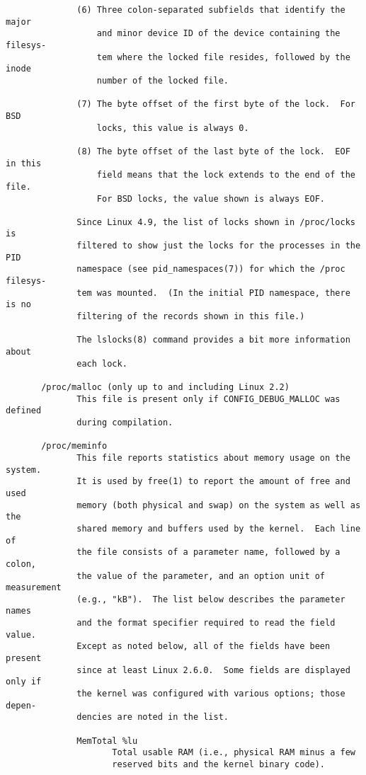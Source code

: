 \documentclass[]{article}
\begin{document}
\begin{verbatim}
              (6) Three colon-separated subfields that identify the major
                  and minor device ID of the device containing the filesys‐
                  tem where the locked file resides, followed by the inode
                  number of the locked file.

              (7) The byte offset of the first byte of the lock.  For BSD
                  locks, this value is always 0.

              (8) The byte offset of the last byte of the lock.  EOF in this
                  field means that the lock extends to the end of the file.
                  For BSD locks, the value shown is always EOF.

              Since Linux 4.9, the list of locks shown in /proc/locks is
              filtered to show just the locks for the processes in the PID
              namespace (see pid_namespaces(7)) for which the /proc filesys‐
              tem was mounted.  (In the initial PID namespace, there is no
              filtering of the records shown in this file.)

              The lslocks(8) command provides a bit more information about
              each lock.

       /proc/malloc (only up to and including Linux 2.2)
              This file is present only if CONFIG_DEBUG_MALLOC was defined
              during compilation.

       /proc/meminfo
              This file reports statistics about memory usage on the system.
              It is used by free(1) to report the amount of free and used
              memory (both physical and swap) on the system as well as the
              shared memory and buffers used by the kernel.  Each line of
              the file consists of a parameter name, followed by a colon,
              the value of the parameter, and an option unit of measurement
              (e.g., "kB").  The list below describes the parameter names
              and the format specifier required to read the field value.
              Except as noted below, all of the fields have been present
              since at least Linux 2.6.0.  Some fields are displayed only if
              the kernel was configured with various options; those depen‐
              dencies are noted in the list.

              MemTotal %lu
                     Total usable RAM (i.e., physical RAM minus a few
                     reserved bits and the kernel binary code).


\end{verbatim}
\end{document}
